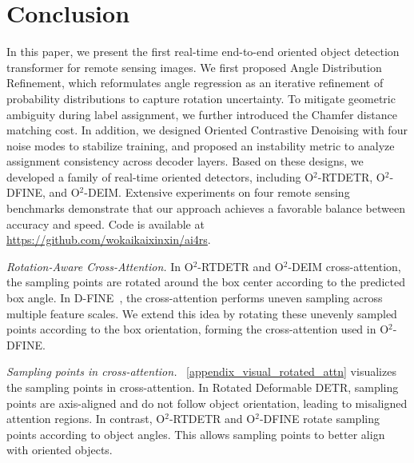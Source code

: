 \documentclass[lettersize,journal]{IEEEtran}
\begin{document}
\visualresults

\section{Conclusion}

In this paper, we present the first real-time end-to-end oriented object detection transformer for remote sensing images. We first proposed Angle Distribution Refinement, which reformulates angle regression as an iterative refinement of probability distributions to capture rotation uncertainty. To mitigate geometric ambiguity during label assignment, we further introduced the Chamfer distance matching cost. In addition, we designed Oriented Contrastive Denoising with four noise modes to stabilize training, and proposed an instability metric to analyze assignment consistency across decoder layers. Based on these designs, we developed a family of real-time oriented detectors, including O$^2$-RTDETR, O$^2$-DFINE, and O$^2$-DEIM. Extensive experiments on four remote sensing benchmarks demonstrate that our approach achieves a favorable balance between accuracy and speed.  Code is available at \url{https://github.com/wokaikaixinxin/ai4rs}.


\appendix

\textit{Rotation-Aware Cross-Attention.}
In O$^2$-RTDETR and O$^2$-DEIM cross-attention, the sampling points are rotated around the box center according to the predicted box angle. 
In D-FINE~\cite{dfine}, the cross-attention performs uneven sampling across multiple feature scales. We extend this idea by rotating these unevenly sampled points according to the box orientation, forming the cross-attention used in O$^2$-DFINE.



\textit{Sampling points in cross-attention.}
\figurename~\ref{appendix_visual_rotated_attn} visualizes the sampling points in cross-attention. In Rotated Deformable DETR, sampling points are axis-aligned and do not follow object orientation, leading to misaligned attention regions. In contrast, O$^2$-RTDETR and O$^2$-DFINE rotate sampling points according to object angles. This allows sampling points to better align with oriented objects.

\AppendixvisualRoatedAttn



\end{document}
